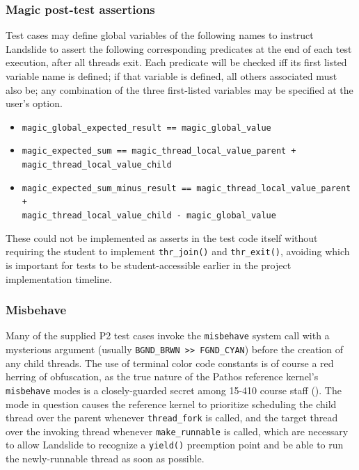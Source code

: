 \subsubsection{Magic post-test assertions}

Test cases may define global variables of the following names
to instruct Landslide to assert the following corresponding predicates at the end of each test execution,
after all threads exit.
Each predicate will be checked iff its first listed variable name is defined;
if that variable is defined, all others associated must also be;
any combination of the three first-listed variables may be specified at the user's option.
\begin{itemize}
	\item {\tt magic\_global\_expected\_result == magic\_global\_value}
	\item {\tt magic\_expected\_sum == magic\_thread\_local\_value\_parent +} \\ {\tt magic\_thread\_local\_value\_child}
	\item {\tt magic\_expected\_sum\_minus\_result == magic\_thread\_local\_value\_parent +} \\ {\tt magic\_thread\_local\_value\_child - magic\_global\_value}
\end{itemize}
These could not be implemented as asserts in the test code itself
without requiring the student to implement {\tt thr\_join()} and {\tt thr\_exit()},
avoiding which is important for tests to be student-accessible earlier in the project implementation timeline.

\subsubsection{Misbehave}
\label{sec:landslide-friendly-misbehave}

Many of the supplied P2 test cases invoke the {\tt misbehave} system call
with a mysterious argument (usually {\tt BGND\_BRWN >> FGND\_CYAN})
before the creation of any child threads.
The use of terminal color code constants is of course a red herring of obfuscation,
as the true nature of the Pathos reference kernel's {\tt misbehave} modes
is a closely-guarded secret among 15-410 course staff (\sect{\ref{sec:410-secrecy}}).
The mode in question causes the reference kernel to prioritize scheduling the child thread over the parent
whenever {\tt thread\_fork} is called,
and the target thread over the invoking thread
whenever {\tt make\_runnable} is called,
which are necessary to allow Landslide to recognize a {\tt yield()} preemption point
and be able to run the newly-runnable thread as soon as possible.

